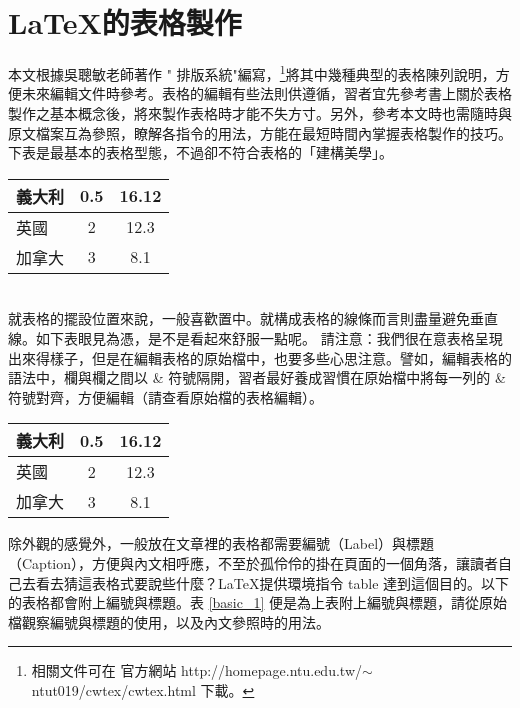 %
%
\chapter{\LaTeX  的表格製作}
本文根據吳聰敏老師著作 "\cw{} 排版系統"編寫，\footnote{相關文件可在 \cw{} 官方網站  http://homepage.ntu.edu.tw/$\sim$ntut019/cwtex/cwtex.html 下載。}將其中幾種典型的表格陳列說明，方便未來編輯文件時參考。表格的編輯有些法則供遵循，習者宜先參考書上關於表格製作之基本概念後，將來製作表格時才能不失方寸。另外，參考本文時也需隨時與原文檔案互為參照，瞭解各指令的用法，方能在最短時間內掌握表格製作的技巧。下表是最基本的表格型態，不過卻不符合表格的「建構美學」。\\

\begin{tabular}{|l|c|c|}%
\hline  %
  義大利  & 0.5  & 16.12		\\\hline  %
  英國     & 2     & 12.3		\\\hline
  加拿大  & 3     & 8.1			\\\hline
\end{tabular}\\

就表格的擺設位置來說，一般喜歡置中。就構成表格的線條而言則盡量避免垂直線。如下表眼見為憑，是不是看起來舒服一點呢。
請注意：我們很在意表格呈現出來得樣子，但是在編輯表格的原始檔中，也要多些心思注意。譬如，編輯表格的語法中，欄與欄之間以 \& 符號隔開，習者最好養成習慣在原始檔中將每一列的 \& 符號對齊，方便編輯（請查看原始檔的表格編輯）。\\

\begin{center} %
\begin{tabular}{lcc}  %
\hline
  義大利  & 0.5  & 16.12		\\\hline  %
  英國     & 2     & 12.3		\\\hline
  加拿大  & 3     & 8.1			\\\hline
\end{tabular}
\end{center}
\bigskip
除外觀的感覺外，一般放在文章裡的表格都需要編號（Label）與標題（Caption），方便與內文相呼應，不至於孤伶伶的掛在頁面的一個角落，讓讀者自己去看去猜這表格式要說些什麼？\LaTeX 提供環境指令 {\A table} 達到這個目的。以下的表格都會附上編號與標題。表 \ref{basic_1} 便是為上表附上編號與標題，請從原始檔觀察編號與標題的使用，以及內文參照時的用法。

